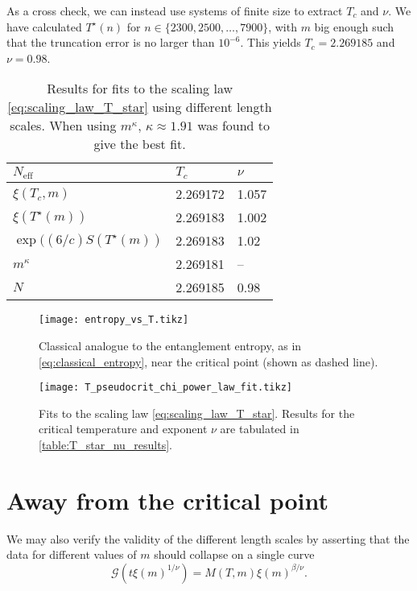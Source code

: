 As a cross check, we can instead use systems of finite size to extract $T_c$ and $\nu$.
We have calculated $T^{\star}(n)$ for $n \in \{ 2300, 2500, \dots, 7900 \}$,
with $m$ big enough such that the truncation error is no larger than $10^{-6}$.
This yields $T_c = 2.269185$ and $\nu = 0.98$.

\begin{table}[]
\centering
\begin{tabular}{@{}lll@{}} \toprule
$N_{\text{eff}}$                  & $T_c$   & $\nu$   \\ \midrule
$\xi(T_c, m)$                     & 2.269172  & 1.057         \\
$\xi(T^{\star}(m))$               & 2.269183   & 1.002        \\
$\exp((6/c)S(T^{\star}(m))$       & 2.269183   & 1.02       \\
$m^{\kappa}$                      & 2.269181  & --        \\
$N$                               & 2.269185  & 0.98          \\ \bottomrule
\end{tabular}
  \caption{Results for fits to the scaling law \autoref{eq:scaling_law_T_star} using different length scales.
  When using $m^{\kappa}$, $\kappa \approx 1.91$ was found to give the best fit.} \label{table:T_star_nu_results}
\end{table}

\begin{figure}
  \texttt{[image: entropy\_vs\_T.tikz]}
  \caption{Classical analogue to the entanglement entropy, as in \autoref{eq:classical_entropy},
  near the critical point (shown as dashed line).}\label{fig:entropy_vs_T}
\end{figure}

\begin{figure}
  \texttt{[image: T\_pseudocrit\_chi\_power\_law\_fit.tikz]}
  \caption{Fits to the scaling law \autoref{eq:scaling_law_T_star}.
  Results for the critical temperature and exponent $\nu$ are tabulated in
  \autoref{table:T_star_nu_results}.}\label{fig:T_pseudocrit_chi_power_law_fit}
\end{figure}

\section{Away from the critical point}

We may also verify the validity of the different length scales by asserting that the data for different values of $m$
should collapse on a single curve
\begin{equation}
  \mathcal{G}(t \xi(m)^{1/\nu}) = M(T, m) \xi(m)^{\beta/\nu}.
\end{equation}

